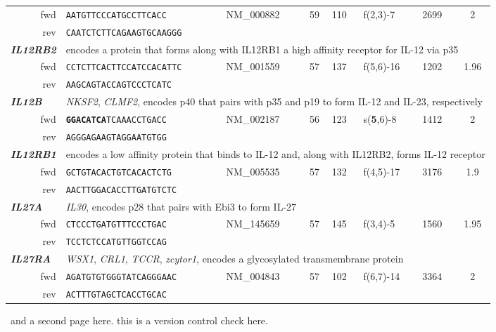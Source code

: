 \documentclass[12pt,a4paper]{scrreprt} %
\begin{document}
\begin{table}[htbp]
{\begin{tabular}{rllclllc}
\ fwd & \texttt{AATGTTCCCATGCCTTCACC} & NM\_000882 & 59 & 110 & f(2,3)-7 & 2699 & 2 \\ 
\ rev & \texttt{CAATCTCTTCAGAAGTGCAAGGG} &  &  &  &  &  &  \\ 
\hline \multicolumn{1}{l}{\textit{\textbf{IL12RB2}}} & \multicolumn{7}{l}{encodes a protein that forms along with IL12RB1 a high affinity receptor for IL-12 via p35} \\ 
\ fwd & \texttt{CCTCTTCACTTCCATCCACATTC} & NM\_001559 & 57 & 137 & f(5,6)-16 & 1202 & 1.96 \\ 
\ rev & \texttt{AAGCAGTACCAGTCCCTCATC} &  &  &  &  &  &  \\ 
\hline \multicolumn{1}{l}{\textit{\textbf{IL12B}}} & \multicolumn{7}{l}{\textit{NKSF2}, \textit{CLMF2}, encodes p40 that pairs with p35 and p19 to form IL-12 and IL-23, respectively} \\ 
\ fwd & \texttt{\textbf{GGACATCA}TCAAACCTGACC} & NM\_002187 & 56 & 123 & s(\textbf{5},6)-8 & 1412 & 2 \\ 
\ rev & \texttt{AGGGAGAAGTAGGAATGTGG} &  &  &  &  &  &  \\ 
\hline \multicolumn{1}{l}{\textit{\textbf{IL12RB1}}} & \multicolumn{7}{l}{encodes a low affinity protein that binds to IL-12 and, along with IL12RB2, forms IL-12 receptor} \\ 
\ fwd & \texttt{GCTGTACACTGTCACACTCTG} & NM\_005535 & 57 & 132 & f(4,5)-17 & 3176 & 1.9 \\ 
\ rev & \texttt{AACTTGGACACCTTGATGTCTC} &  &  &  &  &  &  \\ 
\hline \multicolumn{1}{l}{\textit{\textbf{IL27A}}} & \multicolumn{7}{l}{\textit{IL30}, encodes p28 that pairs with Ebi3 to form IL-27} \\ 
\ fwd & \texttt{CTCCCTGATGTTTCCCTGAC} & NM\_145659 & 57 & 145 & f(3,4)-5 & 1560 & 1.95 \\ 
\ rev & \texttt{TCCTCTCCATGTTGGTCCAG} &  &  &  &  &  &  \\ 
\hline \multicolumn{1}{l}{\textit{\textbf{IL27RA}}} & \multicolumn{7}{l}{\textit{WSX1}, \textit{CRL1}, \textit{TCCR}, \textit{zcytor1}, encodes a glycosylated transmembrane protein} \\ 
\ fwd & \texttt{AGATGTGTGGGTATCAGGGAAC} & NM\_004843 & 57 & 102 & f(6,7)-14 & 3364 & 2 \\ 
\ rev & \texttt{ACTTTGTAGCTCACCTGCAC} &  &  &  &  &  &  \\ 
\bottomrule
\end{tabular} }
\end{table}
\newpage
\ and a second page here. this is a version control check here.
\end{document}
